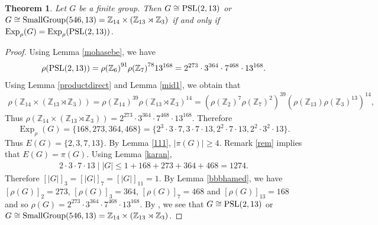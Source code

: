 \documentclass[12pt]{amsart}
\newtheorem{theorem}{Theorem}[section]
\theoremstyle{definition}
\begin{document}
			\begin{theorem}
			Let $G$ be a finite group. Then
			$G \cong {\rm PSL}(2,13)$ or $G \cong  {\rm SmallGroup}(546, 13)=\mathbb{Z}_{14} \times (\mathbb{Z}_{13} \rtimes \mathbb{Z}_{3})$  if and only if  ${\operatorname{Exp}}_{\rho}(G) = {\operatorname{Exp}}_{\rho}({\rm PSL}(2,13))$.
		\end{theorem}

	\begin{proof}
					Using Lemma \ref{mohasebe}, we have
		\begin{align*}
			\rho({\rm PSL}(2,13))={\rho(\mathbb{Z}_{6})}^{91} {\rho(\mathbb{Z}_{7})}^{78}  13^{168}=2^{273}\cdot3^{364}\cdot7^{468}\cdot13^{168}.
		\end{align*}
		Using Lemma \ref{productdirect} and Lemma \ref{mid1}, we obtain that
	\begin{align*}
		\rho({\mathbb{Z}_{14} \times (\mathbb{Z}_{13} \rtimes \mathbb{Z}_{3})})
		={\rho(\mathbb{Z}_{14})}^{39} {\rho(\mathbb{Z}_{13} \rtimes \mathbb{Z}_{3})}^{14} =
		(\rho(\mathbb{Z}_{2})^7\rho(\mathbb{Z}_{7})^2)^{39}(\rho(\mathbb{Z}_{13}) \rho(\mathbb{Z}_{3})^{13})^{14},
	\end{align*}
Thus $	\rho({\mathbb{Z}_{14} \times (\mathbb{Z}_{13} \rtimes \mathbb{Z}_{3})})=2^{273}\cdot3^{364}\cdot7^{468}\cdot13^{168}$.
		Therefore $$ {\operatorname{Exp}}_{\rho}(G) = \{168, 273, 364, 468\}=\{2^3\cdot 3 \cdot 7,		3 \cdot 7 \cdot 13,		2^2 \cdot 7 \cdot 13, 2^2\cdot3^2\cdot 13\}.$$
		Thus $E(G)=\{2, 3, 7, 13\}$.
		By Lemma  \ref{111}, $|\pi(G)|\geqslant 4$.
Remark \ref{rem} implies that $E(G)=\pi(G)$.
		Using Lemma \ref{karan},
		\begin{align}%
			2 \cdot 3 \cdot 7 \cdot 13 \mid |G| \leq 1 + 168 + 273 + 364 + 468=1274.
		\end{align}
		Therefore $[|G|]_3=[|G|]_7=[|G|]_{11}=1$.
		By Lemma \ref{bbbhamed},
		we have $[\rho(G)]_2=273$, $[\rho(G)]_3=364$, $[\rho(G)]_7=468$ and $[\rho(G)]_{13}=168$  and so
		$\rho(G) = 2^{273}\cdot3^{364}\cdot7^{468} \cdot 13^{168}$.
		By \cite[Theorem 6]{baniMal}, we see that $G \cong {\rm PSL}(2,13)$ or
		$G \cong {\rm SmallGroup}(546, 13)=\mathbb{Z}_{14} \times (\mathbb{Z}_{13} \rtimes \mathbb{Z}_{3})$.
	\end{proof}	
\end{document}
